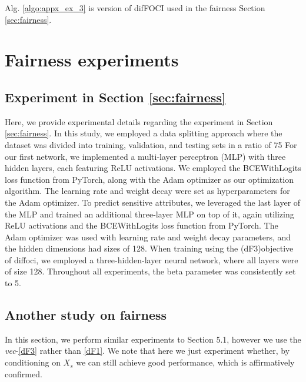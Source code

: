 Alg. \ref{algo:appx_ex_3} is version of difFOCI used in the fairness Section \ref{sec:fairness}.







\section{Fairness experiments}
\label{sec:fairne_apx}

\subsection{Experiment in Section \ref{sec:fairness}}

Here, we provide experimental details regarding the experiment in Section \ref{sec:fairness}. In this study, we employed a data splitting approach where the dataset was divided into training, validation, and testing sets in a ratio of 75%
For our first network, we implemented a multi-layer perceptron (MLP) with three hidden layers, each featuring ReLU activations. We employed the BCEWithLogits loss function from PyTorch, along with the Adam optimizer as our optimization algorithm. The learning rate and weight decay were set as hyperparameters for the Adam optimizer.
To predict sensitive attributes, we leveraged the last layer of the MLP and trained an additional three-layer MLP on top of it, again utilizing ReLU activations and the BCEWithLogits loss function from PyTorch. The Adam optimizer was used with learning rate and weight decay parameters, and the hidden dimensions had sizes of 128.
When training using the (dF3)objective of diffoci, we employed a three-hidden-layer neural network, where all layers were of size 128. Throughout all experiments, the beta parameter was consistently set to 5.

\subsection{Another study on fairness}

In this section, we perform similar experiments to Section 5.1, however we use the \textit{vec}-\ref{dF3} rather than \ref{dF1}. We note that here we just experiment whether, by conditioning on $X_s$ we can still achieve good performance, which is affirmatively confirmed.

